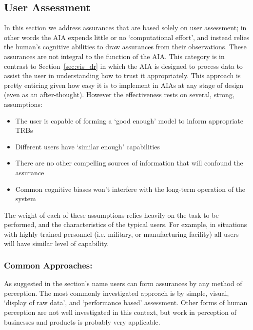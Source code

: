 \subsection{User Assessment} \label{sec:user_assessment}
In this section we address assurances that are based solely on user assessment; in other words the AIA expends little or no `computational effort', and instead relies the human's cognitive abilities to draw assurances from their observations. These  assurances are not integral to the function of the AIA. This category is in contrast to Section~\ref{sec:vis_dr} in which the AIA is designed to process data to assist the user in understanding how to trust it appropriately. This approach is pretty enticing given how easy it is to implement in AIAs at any stage of design (even as an after-thought). However the effectiveness rests on several, strong, assumptions:

\begin{itemize}
    \item The user is capable of forming a `good enough' model to inform appropriate TRBs
    \item Different users have `similar enough' capabilities
    \item There are no other compelling sources of information that will confound the assurance
    \item Common cognitive biases won't interfere with the long-term operation of the system
\end{itemize}

The weight of each of these assumptions relies heavily on the task to be performed, and the characteristics of the typical users. For example, in situations with highly trained personnel (i.e. military, or manufacturing facility) all users will have similar level of capability.

\subsubsection{Common Approaches:}
As suggested in the section's name users can form assurances by any method of perception. The most commonly investigated approach is by simple, visual, `display of raw data', and `performance based' assessment. Other forms of human perception are not well investigated in this context, but work in perception of businesses and products is probably very applicable.

